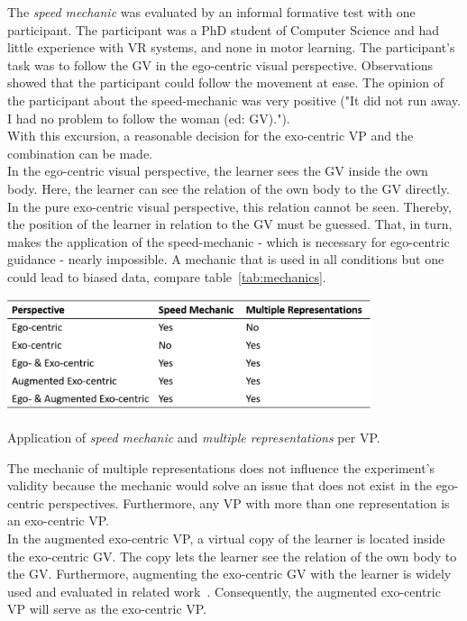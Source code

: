 The \textit{speed mechanic} was evaluated by an informal formative test with one participant. The participant was a PhD student of Computer Science and had little experience with VR systems, and none in motor learning. The participant's task was to follow the GV in the ego-centric visual perspective. Observations showed that the participant could follow the movement at ease. The opinion of the participant about the speed-mechanic was very positive ("It did not run away. I had no problem to follow the woman (ed: GV).").\\
With this excursion, a reasonable decision for the exo-centric VP and the combination can be made.\\

In the ego-centric visual perspective, the learner sees the GV inside the own body. Here, the learner can see the relation of the own body to the GV directly. In the pure exo-centric visual perspective, this relation cannot be seen. Thereby, the position of the learner in relation to the GV must be guessed. That, in turn, makes the application of the speed-mechanic - which is necessary for ego-centric guidance - nearly impossible. A mechanic that is used in all conditions but one could lead to biased data, compare table~\ref{tab:mechanics}.
\begin{table}[htb]
	\centering
	\includegraphics[width=0.8\textwidth]{figures/mechanics_comparison.png}
	\caption[Application of mechanics per visual perspective]{Application of \textit{speed mechanic} and \textit{multiple representations} per VP.}
	\label{tab:mechanics}
\end{table}
The mechanic of multiple representations does not influence the experiment's validity because the mechanic would solve an issue that does not exist in the ego-centric perspectives. Furthermore, any VP with more than one representation is an exo-centric VP.\\
In the augmented exo-centric VP, a virtual copy of the learner is located inside the exo-centric GV. The copy lets the learner see the relation of the own body to the GV. Furthermore, augmenting the exo-centric GV with the learner is widely used and evaluated in related work~\cite{YouMove,thaichichua}. Consequently, the augmented exo-centric VP will serve as the exo-centric VP.\\
